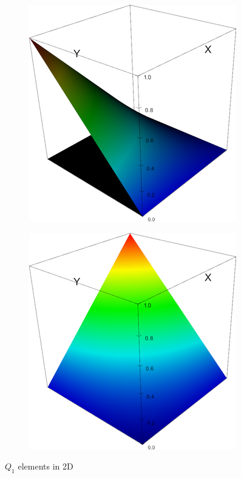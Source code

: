 \begin{frame}
\begin{figure}
\begin{subfigure}{0.2\textwidth}
\end{subfigure}
\hfill{}
\begin{subfigure}{0.2\textwidth}
  \includegraphics[width=\textwidth]{addendum/figures/Q1_shape0002.png}
\end{subfigure}
\hfill{}
\begin{subfigure}{0.2\textwidth}
  \includegraphics[width=\textwidth]{addendum/figures/Q1_shape0003.png}
\end{subfigure}
\hfill{}
\caption{\(Q_1\) elements in 2D
}
\end{figure}
\end{frame}
